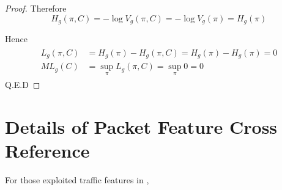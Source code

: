 \begin{proof}
	Therefore
	\begin{equation*}
		H_g(\pi, C) = -\log{V_g(\pi, C)} = -\log{V_g(\pi)} = H_g(\pi)
	\end{equation*}
	
	Hence 
	\begin{eqnarray*}
		\begin{aligned}
			L_g(\pi, C) &= H_g(\pi) - H_g(\pi,C) = H_g(\pi) - H_g(\pi) = 0\\
			ML_g(C) &= \sup_{\pi} L_g(\pi, C) = \sup_{\pi} 0 = 0
		\end{aligned}
	\end{eqnarray*}
	Q.E.D
\end{proof}

\chapter{Details of Packet Feature Cross Reference} \label{Detail Cross Reference}

For those exploited traffic features in ,

